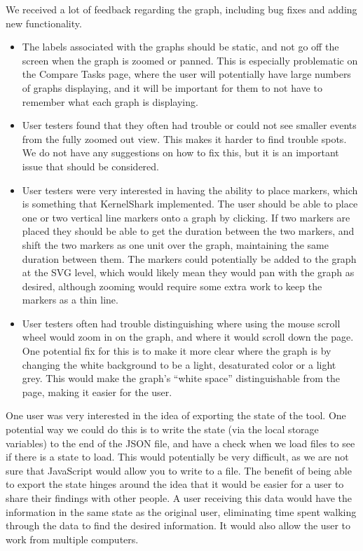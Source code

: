 \documentclass{hmcclinic}
\begin{document}
We received a lot of feedback regarding the graph, including bug fixes and adding new functionality.
  \begin{itemize}

  \item The labels associated with the graphs should be static, and not go off the screen when 
  the graph is zoomed or panned. This is especially problematic on the Compare Tasks page, 
  where the user will potentially have large numbers of graphs displaying, and it will be 
  important for them to not have to remember what each graph is displaying.

  \item User testers found that they often had trouble or could not see smaller events 
  from the fully zoomed out view. This makes it harder to find trouble spots. We do not 
  have any suggestions on how to fix this, but it is an important issue that should be 
  considered.

  \item User testers were very interested in having the ability to place markers, which 
  is something that KernelShark implemented. The user should be able to place one or two
   vertical line markers onto a graph by clicking. If two markers are placed they should
    be able to get the duration between the two markers, and shift the two markers as one
     unit over the graph, maintaining the same duration between them. The markers could
      potentially be added to the graph at the SVG level, which would likely mean they 
      would pan with the graph as desired, although zooming would require some extra 
      work to keep the markers as a thin line.

  \item User testers often had trouble distinguishing where using the mouse scroll wheel
   would zoom in on the graph, and where it would scroll down the page. One potential fix
    for this is to make it more clear where the graph is by changing the white background
     to be a light, desaturated color or a light grey. This would make the
     graph's ``white
      space'' distinguishable from the page, making it easier for the user.

  \end{itemize}

One user was very interested in the idea of exporting the state of the tool. One 
potential way we could do this is to write the state (via the local storage variables)
 to the end of the JSON file, and have a check when we load files to see if there 
 is a state to load. This would potentially be very difficult, as we are not sure 
 that JavaScript would allow you to write to a file. The benefit of being able to 
 export the state hinges around the idea that it would be easier for a user to 
 share their findings with other people. A user receiving this data would have the 
 information in the same state as the original user, eliminating time spent walking 
 through the data to find the desired information. It would also allow the user to 
 work from multiple computers.
\end{document}
